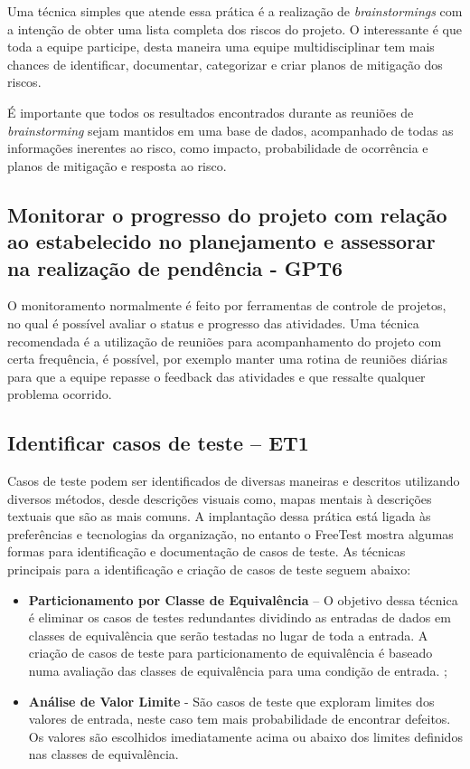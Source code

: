 Uma técnica simples que atende essa prática é a realização de \textit{brainstormings} com a intenção de obter uma lista completa dos riscos do projeto. O interessante é que toda a equipe participe, desta maneira uma equipe multidisciplinar tem mais chances de identificar, documentar, categorizar e criar planos de mitigação dos riscos.

É importante que todos os resultados encontrados durante as reuniões de \textit{brainstorming} sejam mantidos em uma base de dados, acompanhado de todas as informações inerentes ao risco, como impacto, probabilidade de ocorrência e planos de mitigação e resposta ao risco.

\subsection{Monitorar o progresso do projeto com relação ao estabelecido no planejamento e assessorar na realização de pendência - GPT6}
\label{sec:guiagpt6}

O monitoramento normalmente é feito por ferramentas de controle de projetos, no qual é possível avaliar o status e progresso das atividades. Uma técnica recomendada é a utilização de reuniões para acompanhamento do projeto com certa frequência, é possível, por exemplo manter uma rotina de reuniões diárias para que a equipe repasse o feedback das atividades e que ressalte qualquer problema ocorrido.

\subsection{Identificar casos de teste – ET1}
\label{sec:guiaet1}

Casos de teste podem ser identificados de diversas maneiras e descritos utilizando diversos métodos, desde descrições visuais como, mapas mentais à descrições textuais que são as mais comuns. A implantação dessa prática está ligada às preferências e tecnologias da organização, no entanto o FreeTest mostra algumas formas para identificação e documentação de casos de teste. As técnicas principais para a identificação e criação de casos de teste seguem abaixo:

\begin{itemize}
    \item \textbf{Particionamento por Classe de Equivalência} – O objetivo dessa técnica é eliminar os casos de testes redundantes dividindo as entradas de dados em classes de equivalência que serão testadas no lugar de toda a entrada. A criação de casos de teste para particionamento de equivalência é baseado numa avaliação das classes de equivalência para uma condição de entrada. ;
    \item \textbf{Análise de Valor Limite} - São casos de teste que exploram limites dos valores de entrada, neste caso tem mais probabilidade de encontrar defeitos. Os valores são escolhidos imediatamente acima ou abaixo dos limites definidos nas classes de equivalência.
\end{itemize}

